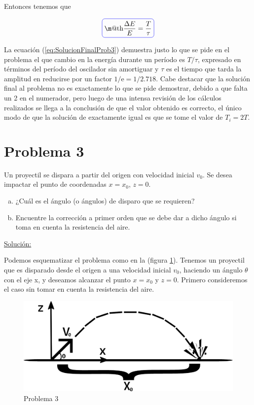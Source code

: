 \documentclass[a4paper,10pt]{article}
\makeatletter
\numberwithin{equation}{section}
\newcommand*{\boxcolor}{blue}
\renewcommand{\boxed}[1]{\textcolor{\boxcolor}{%
\tikz[baseline={([yshift=-1ex]current bounding box.center)}] \node [rectangle, minimum width=1ex,rounded corners,draw] {\normalcolor\m@th$\displaystyle#1$};}}
\newcommand{\euler}{\mathrm{e}}
\makeatother
\begin{document}
Entonces tenemos que 

\begin{equation}
 \boxed{\frac{\Delta E}{E} = \frac{T}{\tau}}
 \label{eq:SolucionFinalProb3}
\end{equation}

La ecuación (\ref{eq:SolucionFinalProb3}) demuestra justo lo que se pide en el problema
el que cambio en la energía durante un período es $T/\tau$, expresado en términos del
período del oscilador sin amortiguar y $\tau$ es el tiempo que tarda la amplitud en reducirse
por un factor $1/\euler = 1 / 2.718$. Cabe destacar que la solución final al problema no
es exactamente lo que se pide demostrar, debido a que falta un 2 en el numerador, pero
luego de una intensa revisión de los cálculos realizados se llega a la conclusión de que
el valor obtenido es correcto, el único modo de que la solución de exactamente igual
es que se tome el valor de $T_i = 2T$.

\vspace{.3cm}

\section{Problema 3}
Un proyectil se dispara a partir del origen con velocidad inicial $v_{0}$.
Se desea impactar el punto de coordenadas $x=x_{0}$, $z=0$.

\begin{enumerate}[a)]
 \item ¿Cuál es el ángulo (o ángulos) de disparo que se requieren?
 \item Encuentre la corrección a primer orden que se debe dar a dicho ángulo si toma 
 en cuenta la resistencia del aire.
\end{enumerate}
\vspace{.3cm}

\underline{Solución:}

\vspace{.3cm}

Podemos esquematizar el problema como en la (figura \ref{fig:problema3}). 
Tenemos un proyectil que es disparado desde el origen a una velocidad 
inicial $v_0$, haciendo un ángulo $\theta$ con el eje x, y deseamos
alcanzar el punto $x=x_0$ y $z=0$. Primero consideremos el caso sin
tomar en cuenta la resistencia del aire.

\begin{figure}[ht]
 \centering
\includegraphics[scale=0.3]{problema3fig1}
\caption{Problema 3}
\label{fig:problema3}
\end{figure}
\end{document}
